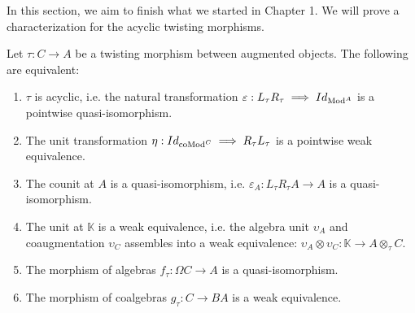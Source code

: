 \documentclass[../thesis.tex]{subfiles}
\begin{document}
            In this section, we aim to finish what we started in Chapter 1. We will prove a characterization for the acyclic twisting morphisms.

            \begin{thm}\label{thm: thm-twist}
                Let $\tau: C \rightarrow A$ be a twisting morphism between augmented objects. The following are equivalent:
                \begin{enumerate}
                    \item $\tau$ is acyclic, i.e. the natural transformation $\varepsilon : L_\tau R_\tau \implies Id_{\tt{Mod}^A}$ is a pointwise quasi-isomorphism.
                    \item The unit transformation $\eta : Id_{\tt{coMod}^C} \implies R_\tau L_\tau$ is a pointwise weak equivalence.
                    \item The counit at $A$ is a quasi-isomorphism, i.e. $\varepsilon_A : L_\tau R_\tau A \rightarrow A$ is a quasi-isomorphism.
                    \item The unit at $\mathbb{K}$ is a weak equivalence, i.e. the algebra unit $\upsilon_A$ and coaugmentation $\upsilon_C$ assembles into a weak equivalence: $\upsilon_A \otimes \upsilon_C : \mathbb{K} \rightarrow A \otimes_\tau C$.
                    \item The morphism of algebras $f_\tau : \Omega C \rightarrow A$ is a quasi-isomorphism.
                    \item The morphism of coalgebras $g_\tau : C \rightarrow BA$ is a weak equivalence.
                \end{enumerate}
            \end{thm}
\end{document}
